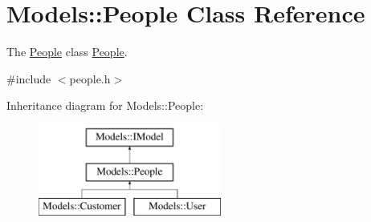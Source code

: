\hypertarget{classModels_1_1People}{\section{Models\-:\-:People Class Reference}
\label{classModels_1_1People}
}


The \hyperlink{classModels_1_1People}{People} class \hyperlink{classModels_1_1People}{People}.  




{\ttfamily \#include $<$people.\-h$>$}

Inheritance diagram for Models\-:\-:People\-:\begin{figure}[H]
\begin{center}
\leavevmode
\includegraphics[height=3.000000cm]{de/d0a/classModels_1_1People}
\end{center}
\end{figure}
